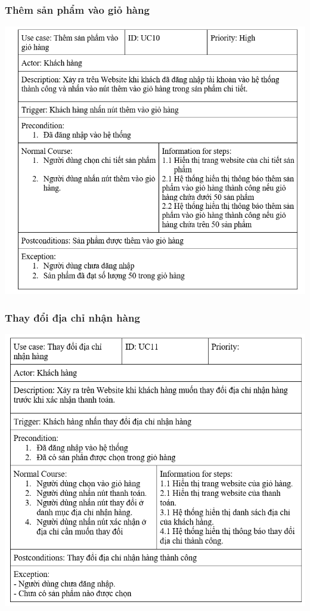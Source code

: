 \documentclass[12pt,a4paper,2sides]{report}
\begin{document}
\subsubsection{Thêm sản phẩm vào giỏ hàng}
    \includegraphics[width=1\linewidth]{lib/usecase/themspvaogio.png}\\\vspace*{1cm}
\subsubsection{Thay đổi địa chỉ nhận hàng}
    \includegraphics[width=1\linewidth]{lib/usecase/thaydoidiachiNh.png}\\\vspace*{1cm}
\end{document}
